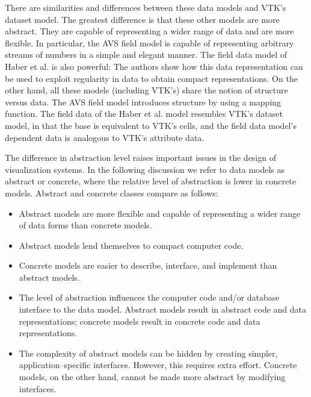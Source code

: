 There are similarities and differences between these data models and VTK's dataset model. The greatest difference is that these other models are more abstract. They are capable of representing a wider range of data and are more flexible. In particular, the AVS field model is capable of representing arbitrary streams of numbers in a simple and elegant manner. The field data model of Haber et al. is also powerful: The authors show how this data representation can be used to exploit regularity in data to obtain compact representations. On the other hand, all these models (including VTK's) share the notion of structure versus data. The AVS field model introduces structure by using a mapping function. The field data of the Haber et al. model resembles VTK's dataset model, in that the base is equivalent to VTK's cells, and the field data model's dependent data is analogous to VTK's attribute data.

The difference in abstraction level raises important issues in the design of visualization systems. In the following discussion we refer to data models as abstract or concrete, where the relative level of abstraction is lower in concrete models. Abstract and concrete classes compare as follows:

\begin{itemize}

	\item Abstract models are more flexible and capable of representing a wider range of data forms than concrete models.

	\item Abstract models lend themselves to compact computer code.

	\item Concrete models are easier to describe, interface, and implement than abstract models.

	\item The level of abstraction influences the computer code and/or database interface to the data model. Abstract models result in abstract code and data representations; concrete models result in concrete code and data representations.

	\item The complexity of abstract models can be hidden by creating simpler, application--specific interfaces. However, this requires extra effort. Concrete models, on the other hand, cannot be made more abstract by modifying interfaces.

\end{itemize}

